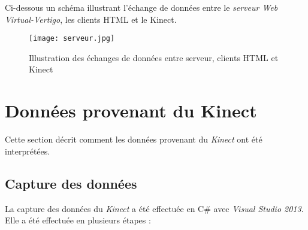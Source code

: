 Ci-dessous un schéma illustrant l'échange de données entre le \textit{serveur Web Virtual-Vertigo}, les clients HTML et le Kinect.
\begin{figure}[H]
\centering
\texttt{[image: serveur.jpg]}
\caption{\label{schemaServeur} Illustration des échanges de données entre serveur, clients HTML et Kinect}
\end{figure}


\pagebreak
\section{Données provenant du Kinect}  \label{donnees}
Cette section décrit comment les données provenant du \textit{Kinect} ont été interprétées.

\subsection{Capture des données}  \label{capture}
La capture des données du \textit{Kinect} a été effectuée en C\# avec \textit{Visual Studio 2013}. Elle a été effectuée en plusieurs étapes : 

